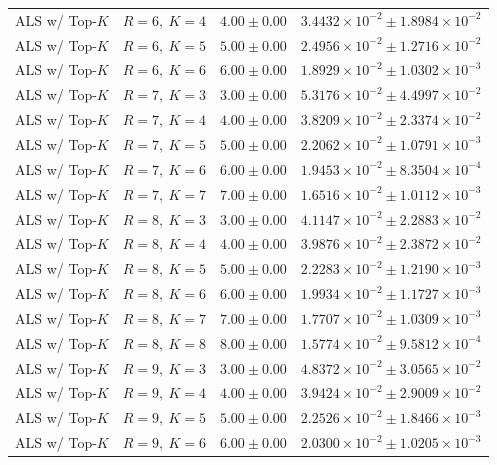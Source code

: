 \begin{table}[t]
\begin{tabular}{@{}llcc@{}}
ALS w/ Top-\(K\) & \(R=6,\ K=4\) & \(4.00 \pm 0.00\) & \(3.4432{\times}10^{-2} \pm 1.8984{\times}10^{-2}\) \\
ALS w/ Top-\(K\) & \(R=6,\ K=5\) & \(5.00 \pm 0.00\) & \(2.4956{\times}10^{-2} \pm 1.2716{\times}10^{-2}\) \\
ALS w/ Top-\(K\) & \(R=6,\ K=6\) & \(6.00 \pm 0.00\) & \(1.8929{\times}10^{-2} \pm 1.0302{\times}10^{-3}\) \\
ALS w/ Top-\(K\) & \(R=7,\ K=3\) & \(3.00 \pm 0.00\) & \(5.3176{\times}10^{-2} \pm 4.4997{\times}10^{-2}\) \\
ALS w/ Top-\(K\) & \(R=7,\ K=4\) & \(4.00 \pm 0.00\) & \(3.8209{\times}10^{-2} \pm 2.3374{\times}10^{-2}\) \\
ALS w/ Top-\(K\) & \(R=7,\ K=5\) & \(5.00 \pm 0.00\) & \(2.2062{\times}10^{-2} \pm 1.0791{\times}10^{-3}\) \\
ALS w/ Top-\(K\) & \(R=7,\ K=6\) & \(6.00 \pm 0.00\) & \(1.9453{\times}10^{-2} \pm 8.3504{\times}10^{-4}\) \\
ALS w/ Top-\(K\) & \(R=7,\ K=7\) & \(7.00 \pm 0.00\) & \(1.6516{\times}10^{-2} \pm 1.0112{\times}10^{-3}\) \\
ALS w/ Top-\(K\) & \(R=8,\ K=3\) & \(3.00 \pm 0.00\) & \(4.1147{\times}10^{-2} \pm 2.2883{\times}10^{-2}\) \\
ALS w/ Top-\(K\) & \(R=8,\ K=4\) & \(4.00 \pm 0.00\) & \(3.9876{\times}10^{-2} \pm 2.3872{\times}10^{-2}\) \\
ALS w/ Top-\(K\) & \(R=8,\ K=5\) & \(5.00 \pm 0.00\) & \(2.2283{\times}10^{-2} \pm 1.2190{\times}10^{-3}\) \\
ALS w/ Top-\(K\) & \(R=8,\ K=6\) & \(6.00 \pm 0.00\) & \(1.9934{\times}10^{-2} \pm 1.1727{\times}10^{-3}\) \\
ALS w/ Top-\(K\) & \(R=8,\ K=7\) & \(7.00 \pm 0.00\) & \(1.7707{\times}10^{-2} \pm 1.0309{\times}10^{-3}\) \\
ALS w/ Top-\(K\) & \(R=8,\ K=8\) & \(8.00 \pm 0.00\) & \(1.5774{\times}10^{-2} \pm 9.5812{\times}10^{-4}\) \\
ALS w/ Top-\(K\) & \(R=9,\ K=3\) & \(3.00 \pm 0.00\) & \(4.8372{\times}10^{-2} \pm 3.0565{\times}10^{-2}\) \\
ALS w/ Top-\(K\) & \(R=9,\ K=4\) & \(4.00 \pm 0.00\) & \(3.9424{\times}10^{-2} \pm 2.9009{\times}10^{-2}\) \\
ALS w/ Top-\(K\) & \(R=9,\ K=5\) & \(5.00 \pm 0.00\) & \(2.2526{\times}10^{-2} \pm 1.8466{\times}10^{-3}\) \\
ALS w/ Top-\(K\) & \(R=9,\ K=6\) & \(6.00 \pm 0.00\) & \(2.0300{\times}10^{-2} \pm 1.0205{\times}10^{-3}\) \\

\end{tabular}
\end{table}
